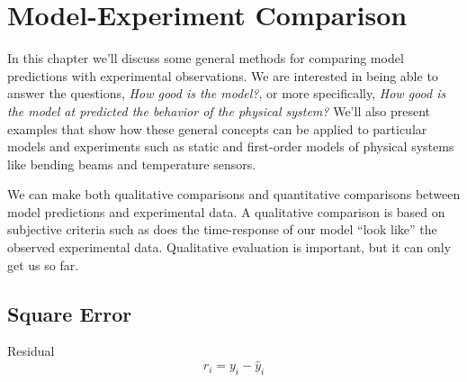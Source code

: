 \chapter{Model-Experiment Comparison}\label{c:compare}

In this chapter we'll discuss some general methods for comparing model predictions with experimental observations.  We are interested in being able to answer the questions, \emph{How good is the model?}, or more specifically, \emph{How good is the model at predicted the behavior of the physical system?}  We'll also present examples that show how these general concepts can be applied to particular models and experiments such as static and first-order models of physical systems like bending beams and temperature sensors.

We can make both \glspl{qualitative comparison} and \glspl{quantitative comparison} between model predictions and experimental data.  A qualitative comparison is based on subjective criteria such as does the time-response of our model ``look like'' the observed experimental data.  Qualitative evaluation is important, but it can only get us so far.  


\section{Square Error}

Residual
\[
r_i = y_i - \hat{y}_i
\]
